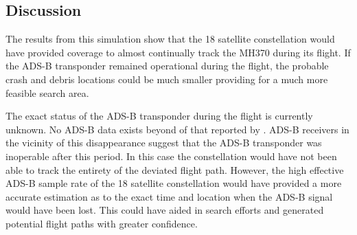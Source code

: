 \subsection{Discussion}
The results from this simulation show that the 18 satellite constellation would have provided coverage to almost continually track the MH370 during its flight. If the ADS-B transponder remained operational during the flight, the probable crash and debris locations could be much smaller providing for a much more feasible search area.

The exact status of the ADS-B transponder during the flight is currently unknown. No ADS-B data exists beyond of that reported by \cite{FlightRadar}. ADS-B receivers in the vicinity of this disappearance suggest that the ADS-B transponder was inoperable after this period. In this case the constellation would have not been able to track the entirety of the deviated flight path. However, the high effective ADS-B sample rate of the 18 satellite constellation would have provided a more accurate estimation as to the exact time and location when the ADS-B signal would have been lost. This could have aided in search efforts and generated potential flight paths with greater confidence.
